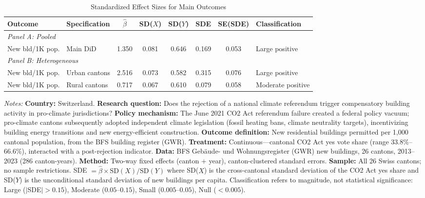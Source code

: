 \begin{table}[H]
\centering
\caption{Standardized Effect Sizes for Main Outcomes}
\label{tab:sde}
\begin{adjustbox}{max width=\textwidth}
\begin{threeparttable}
\begin{tabular}{llcccccl}
\toprule
Outcome & Specification & $\hat{\beta}$ & SD($X$) & SD($Y$) & SDE & SE(SDE) & Classification \\
\midrule
\multicolumn{8}{l}{\textit{Panel A: Pooled}} \\
New bld/1K pop. & Main DiD & 1.350 & 0.081 & 0.646 & 0.169 & 0.053 & Large positive \\
\midrule
\multicolumn{8}{l}{\textit{Panel B: Heterogeneous}} \\
New bld/1K pop. & Urban cantons & 2.516 & 0.073 & 0.582 & 0.315 & 0.076 & Large positive \\
New bld/1K pop. & Rural cantons & 0.717 & 0.067 & 0.610 & 0.079 & 0.058 & Moderate positive \\
\bottomrule
\end{tabular}
\begin{tablenotes}[flushleft]
\small
\item \textit{Notes:} \textbf{Country:} Switzerland. \textbf{Research question:} Does the rejection of a national climate referendum trigger compensatory building activity in pro-climate jurisdictions? \textbf{Policy mechanism:} The June 2021 CO2 Act referendum failure created a federal policy vacuum; pro-climate cantons subsequently adopted independent climate legislation (fossil heating bans, climate neutrality targets), incentivizing building energy transitions and new energy-efficient construction. \textbf{Outcome definition:} New residential buildings permitted per 1,000 cantonal population, from the BFS building register (GWR). \textbf{Treatment:} Continuous---cantonal CO2 Act yes vote share (range 33.8\%--66.6\%), interacted with a post-rejection indicator. \textbf{Data:} BFS Gebäude- und Wohnungsregister (GWR) new buildings, 26 cantons, 2013--2023 (286 canton-years). \textbf{Method:} Two-way fixed effects (canton + year), canton-clustered standard errors. \textbf{Sample:} All 26 Swiss cantons; no sample restrictions. SDE $= \hat{\beta} \times \text{SD}(X) / \text{SD}(Y)$ where SD($X$) is the cross-cantonal standard deviation of the CO2 Act yes share and SD($Y$) is the unconditional standard deviation of new buildings per capita. Classification refers to magnitude, not statistical significance: Large ($|$SDE$| > 0.15$), Moderate ($0.05$--$0.15$), Small ($0.005$--$0.05$), Null ($< 0.005$).
\end{tablenotes}
\end{threeparttable}
\end{adjustbox}
\end{table}
